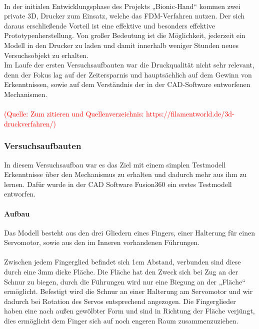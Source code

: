 \documentclass[titlepage,12pt,twoside]{article}
\begin{document}
\\
In der initialen Entwicklungsphase des Projekts „Bionic-Hand“ kommen zwei private 3D, 
Drucker zum Einsatz, welche das FDM-Verfahren nutzen. Der sich daraus erschließende 
Vorteil ist eine effektive und besonders effektive Prototypenherstellung. Von großer 
Bedeutung ist die Möglichkeit, jederzeit ein Modell in den Drucker zu laden und damit 
innerhalb weniger Stunden neues Versuchsobjekt zu erhalten. \\
Im Laufe der ersten Versuchsaufbauten war die Druckqualität nicht sehr relevant, denn 
der Fokus lag auf der Zeitersparnis und hauptsächlich auf dem Gewinn von Erkenntnissen, 
sowie auf dem Verständnis der in der CAD-Software entworfenen Mechanismen. \\
\\
\textcolor{red}{(Quelle: Zum zitieren und Quellenverzeichnis: https://filamentworld.de/3d-druckverfahren/)}

\subsubsection{Versuchsaufbauten}
In diesem Versuchsaufbau war es das Ziel mit einem simplen Testmodell Erkenntnisse über 
den Mechanismus zu erhalten und dadurch mehr aus ihm zu lernen. 
Dafür wurde in der CAD Software Fusion360 ein erstes Testmodell entworfen. \\

\paragraph{Aufbau}
\hfill \break
\hfill \break
Das Modell besteht aus den drei Gliedern eines Fingers, einer Halterung für einen 
Servomotor, sowie aus den im Inneren vorhandenen Führungen. \\
\\
Zwischen jedem Fingerglied befindet sich 1cm Abstand, verbunden sind diese durch eine 
3mm dicke Fläche. Die Fläche hat den Zweck sich bei Zug an der Schnur zu biegen, durch 
die Führungen wird nur eine Biegung an der „Fläche“ ermöglicht. Befestigt wird die
Schnur an einer Halterung am Servomotor und wir dadurch bei Rotation des Servos 
entsprechend angezogen. Die Fingerglieder haben eine nach außen gewölbter Form und sind 
in Richtung der Fläche verjüngt, dies ermöglicht dem Finger sich auf noch engeren Raum 
zusammenzuziehen.
\end{document}
